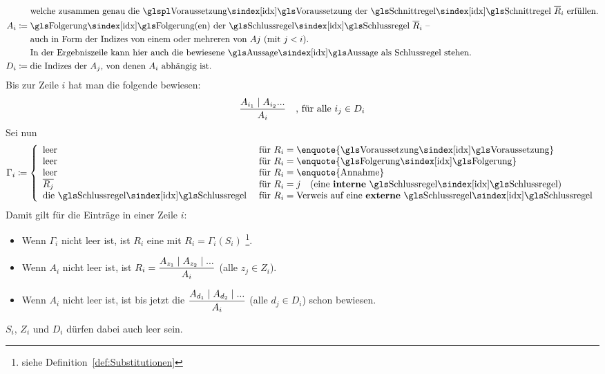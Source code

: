 {\begin{align}
	& \quad\;\; \text{welche zusammen genau die \glsIdxPl{Voraussetzung} der \glsIdx{Schnittregel} } \overline{R}_i \text{ erfüllen.}
	\\
	A_i & \defeq \text{\glsIdx{Folgerung}(en) der \glsIdx{Schlussregel} $\overline{R}_i$ --}\\
	& \quad\;\; \text{auch in Form der Indizes von einem oder mehreren von $Aj$ (mit $j < i$).}\\
	& \quad\;\; \text{In der Ergebniszeile kann hier auch die bewiesene \glsIdx{Aussage} als Schlussregel stehen.}
	\\
	D_i & \defeq \text{die Indizes der $A_j$, von denen $A_i$ abhängig ist.}
\end{align}
Bis zur Zeile $i$ hat man die folgende  bewiesen:
\[ \frac{A_{i_1} \mid A_{i_2} ...}{A_i} \quad \text{, für alle } i_j \in D_i \]
Sei nun
\[
	\Gamma_i \defeq
	\left\{
		\begin{array}{ll}
			\text{leer}    & \text{ für } R_i = \text{\enquote{\glsIdx{Voraussetzung}}} \\
			\text{leer}    & \text{ für } R_i = \text{\enquote{\glsIdx{Folgerung}}}     \\
			\text{leer}    & \text{ für } R_i = \text{\enquote{Annahme}}       \\
			\overline{R_j} & \text{ für } R_i = j \quad \text{(eine \defn{interne} \glsIdx{Schlussregel})} \\
			\text{die \glsIdx{Schlussregel}} & \text{ für } R_i = \text{Verweis auf eine \defn{externe} \glsIdx{Schlussregel}}
		\end{array}
	\right.
\]
Damit gilt für die Einträge in einer Zeile $i$:
\begin{itemize}
	\item Wenn $\Gamma_i$ nicht leer ist, ist $R_i$ eine  mit $R_i = \Gamma_i(S_i)$%
	\footnote{%
		siehe Definition~\eqref{def:Substitutionen} 
	}.
	\item Wenn $A_i$ nicht leer ist, ist $R_i = \dfrac{A_{z_1} \mid A_{z_2} \mid ...}{A_i}$ (alle $z_j \in Z_i$).
	\item Wenn $A_i$ nicht leer ist, ist bis jetzt die  $\dfrac{A_{d_1} \mid A_{d_2} \mid ...}{A_i}$ (alle $d_j \in D_i$) schon bewiesen.
\end{itemize}
$S_i$, $Z_i$ und $D_i$ dürfen dabei auch leer sein.

}
